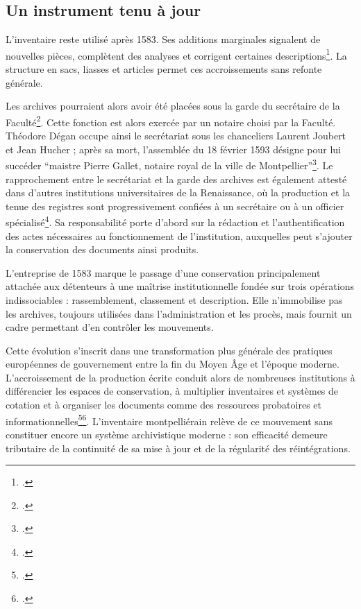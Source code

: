 \subsection{Un instrument tenu à jour}

L'inventaire reste utilisé après 1583. Ses additions marginales signalent de nouvelles pièces, complètent des analyses et corrigent certaines descriptions\footcite[p.~XIII, XXII--XXIII, vues~32 et 41 à 43 de la version numérisée]{CalmetteCartulaire1912}. La structure en sacs, liasses et articles permet ces accroissements sans refonte générale.

Les archives pourraient alors avoir été placées sous la garde du secrétaire de la Faculté\footcite[p.~XIII, vue~32 de la version numérisée]{CalmetteCartulaire1912}. Cette fonction est alors exercée par un notaire choisi par la Faculté. Théodore Dégan occupe ainsi le secrétariat sous les chanceliers Laurent Joubert et Jean Hucher ; après sa mort, l'assemblée du 18 février 1593 désigne pour lui succéder \enquote{maistre Pierre Gallet, notaire royal de la ville de Montpellier}\footcite[fol.~184~v\textsuperscript{o}]{AHFMS8}. Le rapprochement entre le secrétariat et la garde des archives est également attesté dans d'autres institutions universitaires de la Renaissance, où la production et la tenue des registres sont progressivement confiées à un secrétaire ou à un officier spécialisé\footcite{PeekHall1962Cambridge}. Sa responsabilité porte d'abord sur la rédaction et l'authentification des actes nécessaires au fonctionnement de l'institution, auxquelles peut s'ajouter la conservation des documents ainsi produits.

L'entreprise de 1583 marque le passage d'une conservation principalement attachée aux détenteurs à une maîtrise institutionnelle fondée sur trois opérations indissociables : rassemblement, classement et description. Elle n'immobilise pas les archives, toujours utilisées dans l'administration et les procès, mais fournit un cadre permettant d'en contrôler les mouvements.

Cette évolution s'inscrit dans une transformation plus générale des pratiques européennes de gouvernement entre la fin du Moyen Âge et l'époque moderne. L'accroissement de la production écrite conduit alors de nombreuses institutions à différencier les espaces de conservation, à multiplier inventaires et systèmes de cotation et à organiser les documents comme des ressources probatoires et informationnelles\footcite{Head2016Archives}\footcite{Head2019MakingArchives}. L'inventaire montpelliérain relève de ce mouvement sans constituer encore un système archivistique moderne : son efficacité demeure tributaire de la continuité de sa mise à jour et de la régularité des réintégrations.

